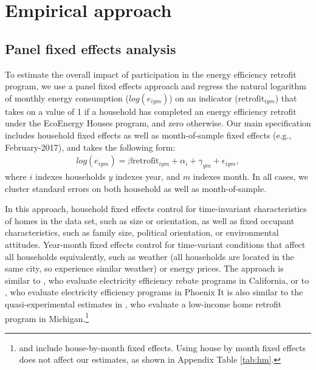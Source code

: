 \documentclass{article}
\begin{document}




\section{Empirical approach}

\subsection{Panel fixed effects analysis}
To estimate the overall impact of participation in the energy efficiency retrofit program, we use a panel fixed effects approach and regress the natural logarithm of monthly energy consumption ($log(e_{iym})$) on an indicator ($\text{retrofit}_{iym}$) that takes on a value of 1 if a household has completed an energy efficiency retrofit under the EcoEnergy Houses program, and zero otherwise. Our main specification includes household fixed effects as well as month-of-sample fixed effects (e.g., February-2017), and takes the following form:
\begin{align}
	log(e_{iym}) = \beta \text{retrofit}_{iym} + \alpha_i + \gamma_{ym} + \epsilon_{iym},
	\label{eq:did}
\end{align}
where $i$ indexes households $y$ indexes year, and $m$ indexes month. In all cases, we cluster standard errors on both household as well as month-of-sample.

In this approach, household fixed effects control for time-invariant characteristics of homes in the data set, such as size or orientation, as well as fixed occupant characteristics, such as family size, political orientation, or environmental attitudes. Year-month fixed effects control for time-variant conditions that affect all households equivalently, such as weather (all households are located in the same city, so experience similar weather) or energy prices. The approach is similar to \cite{chuang2022residential}, who evaluate electricity efficiency rebate programs in California, or to \cite{liang2018energy}, who evaluate electricity efficiency programs in Phoenix It is also similar to the quasi-experimental estimates in \cite{fowlie2018energy}, who evaluate a low-income home retrofit program in Michigan.\footnote{\cite{chuang2022residential} and \cite{fowlie2018energy} include house-by-month fixed effects. Using house by month fixed effects does not affect our estimates, as shown in Appendix Table \ref{tab:hm}.}
\end{document}
